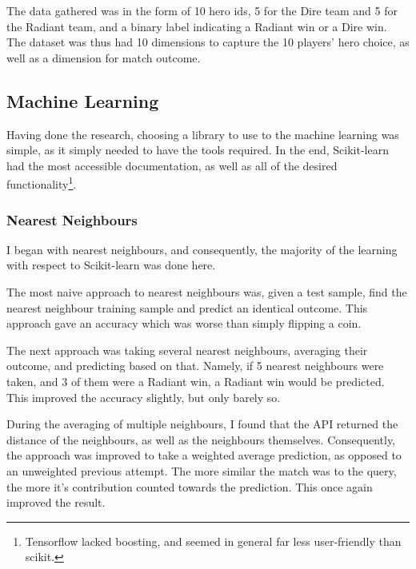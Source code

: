 \documentclass[a4paper, 12pt]{article}
\begin{document}
                 \par The data gathered was in the form of 10 hero ids, 5 for the Dire team and 5 for the Radiant team, and a binary label indicating a Radiant win or a Dire win. The dataset was thus had 10 dimensions to capture the 10 players' hero choice, as well as a dimension for match outcome.
                 
             \subsection{Machine Learning}
             
                 \par Having done the research, choosing a library to use to the machine learning was simple, as it simply needed to have the tools required. In the end, Scikit-learn\cite{sklearn} had the most accessible documentation, as well as all of the desired functionality\footnote{Tensorflow lacked boosting, and seemed in general far less user-friendly than scikit.}.
                 
                 \subsubsection{Nearest Neighbours}
                     
                     \par I began with nearest neighbours, and consequently, the majority of the learning with respect to Scikit-learn was done here.
                     
                     \par The most naive approach to nearest neighbours was, given a test sample, find the nearest neighbour training sample and predict an identical outcome. This approach gave an accuracy which was worse than simply flipping a coin.
                     
                     \par The next approach was taking several nearest neighbours, averaging their outcome, and predicting based on that. Namely, if 5 nearest neighbours were taken, and 3 of them were a Radiant win, a Radiant win would be predicted. This improved the accuracy slightly, but only barely so. 
                     
                     \par During the averaging of multiple neighbours, I found that the API returned the distance of the neighbours, as well as the neighbours themselves. Consequently, the approach was improved to take a weighted average prediction, as opposed to an unweighted previous attempt. The more similar the match was to the query, the more it's contribution counted towards the prediction. This once again improved the result.
                     
\end{document}
